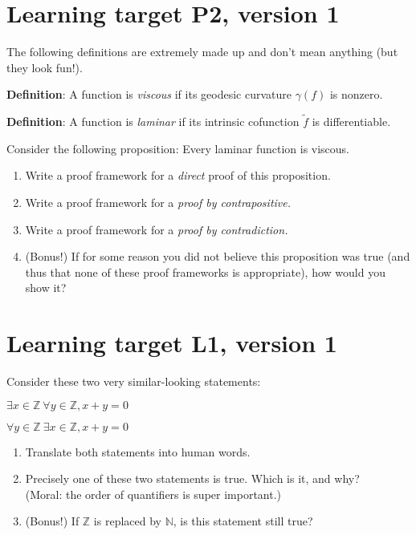 \section{Learning target P2, version 1}

The following definitions are extremely made up and don't mean anything (but they look fun!).

\textbf{Definition}: A function is \textit{viscous} if its geodesic curvature $\gamma(f)$ is nonzero.

\textbf{Definition}: A function is \textit{laminar} if its intrinsic cofunction $\tilde{f}$ is differentiable.

Consider the following proposition: Every laminar function is viscous.

\begin{enumerate}[leftmargin=0pt]
    \item Write a proof framework for a \textit{direct} proof of this proposition.
    \vfill
    \item Write a proof framework for a \textit{proof by contrapositive.}
    \vfill
    \item Write a proof framework for a \textit{proof by contradiction.}
    \vfill
    \item (Bonus!) If for some reason you did not believe this proposition was true (and thus that none of these proof frameworks is appropriate), how would you show it?
\end{enumerate}
\pagebreak
\section{Learning target L1, version 1}

Consider these two very similar-looking statements: 

$\exists x\in \mathbb{Z}\ \forall y \in \mathbb{Z}, x + y = 0$

$\forall y \in \mathbb{Z}\ \exists x\in \mathbb{Z}, x + y = 0$

\begin{enumerate}
    \item Translate both statements into human words.
    \vfill
    \item Precisely one of these two statements is true. Which is it, and why?\\ (Moral: the order of quantifiers is super important.)
    \vfill
    \item (Bonus!) If $\mathbb{Z}$ is replaced by $\mathbb{N}$, is this statement still true?
\end{enumerate}


